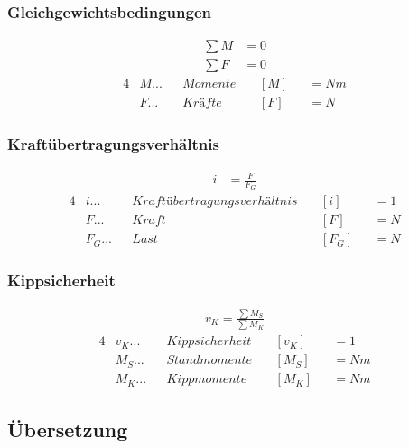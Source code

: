 \documentclass[12pt]{article}
\begin{document}
			\subsubsection{Gleichgewichtsbedingungen}
				\begin{align*}
					\sum M &= 0 \\
					\sum F &= 0
				\end{align*}
				\begin{alignat*}{4}
					&M...&&Momente &&\ [M] &&= Nm \\
					&F...&&Kräfte  &&\ [F] &&= N
				\end{alignat*}

			\subsubsection{Kraftübertragungsverhältnis}
				\begin{align*}
					i &= \frac{F}{F_G}
				\end{align*}
				\begin{alignat*}{4}
					&i  ...&&Kraftübertragungsverhältnis &&\ [i]   &&= 1 \\
					&F  ...&&Kraft                       &&\ [F]   &&= N \\
					&F_G...&&Last                        &&\ [F_G] &&= N
				\end{alignat*}

			\subsubsection{Kippsicherheit}
				\begin{align*}
					v_K = \frac{\sum M_S}{\sum M_K}
				\end{align*}
				\begin{alignat*}{4}
					&v_K...&&Kippsicherheit &&\ [v_K] &&= 1\\
					&M_S...&&Standmomente   &&\ [M_S] &&= Nm\\
					&M_K...&&Kippmomente    &&\ [M_K] &&= Nm
				\end{alignat*}

		\subsection{Übersetzung}
\end{document}
